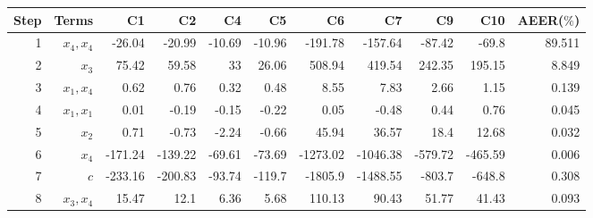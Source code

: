 \begin{tabular}{rrrrrrrrrrr}
Step & Terms & C1 & C2 & C4 & C5 & C6 & C7 & C9 & C10 & AEER($\%$) \\ 
\hline 
1 & $x_4,x_4$ & -26.04 & -20.99 & -10.69 & -10.96 & -191.78 & -157.64 & -87.42 & -69.8 & 89.511 \\ 
2 & $x_3$ & 75.42 & 59.58 & 33 & 26.06 & 508.94 & 419.54 & 242.35 & 195.15 & 8.849 \\ 
3 & $x_1,x_4$ & 0.62 & 0.76 & 0.32 & 0.48 & 8.55 & 7.83 & 2.66 & 1.15 & 0.139 \\ 
4 & $x_1,x_1$ & 0.01 & -0.19 & -0.15 & -0.22 & 0.05 & -0.48 & 0.44 & 0.76 & 0.045 \\ 
5 & $x_2$ & 0.71 & -0.73 & -2.24 & -0.66 & 45.94 & 36.57 & 18.4 & 12.68 & 0.032 \\ 
6 & $x_4$ & -171.24 & -139.22 & -69.61 & -73.69 & -1273.02 & -1046.38 & -579.72 & -465.59 & 0.006 \\ 
7 & $c$ & -233.16 & -200.83 & -93.74 & -119.7 & -1805.9 & -1488.55 & -803.7 & -648.8 & 0.308 \\ 
8 & $x_3,x_4$ & 15.47 & 12.1 & 6.36 & 5.68 & 110.13 & 90.43 & 51.77 & 41.43 & 0.093 \\ 
\hline 
\end{tabular}